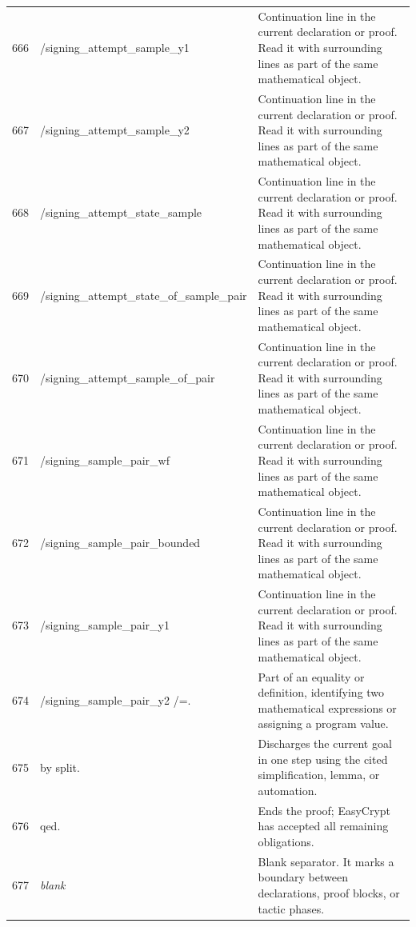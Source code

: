 \documentclass[10pt]{article}
\begin{document}
\begin{longtable}{r L{0.53\textwidth} L{0.37\textwidth}}
666 & {\ttfamily\scriptsize         /signing\_attempt\_sample\_y1} & Continuation line in the current declaration or proof.  Read it with surrounding lines as part of the same mathematical object. \\
667 & {\ttfamily\scriptsize         /signing\_attempt\_sample\_y2} & Continuation line in the current declaration or proof.  Read it with surrounding lines as part of the same mathematical object. \\
668 & {\ttfamily\scriptsize         /signing\_attempt\_state\_sample} & Continuation line in the current declaration or proof.  Read it with surrounding lines as part of the same mathematical object. \\
669 & {\ttfamily\scriptsize         /signing\_attempt\_state\_of\_sample\_pair} & Continuation line in the current declaration or proof.  Read it with surrounding lines as part of the same mathematical object. \\
670 & {\ttfamily\scriptsize         /signing\_attempt\_sample\_of\_pair} & Continuation line in the current declaration or proof.  Read it with surrounding lines as part of the same mathematical object. \\
671 & {\ttfamily\scriptsize         /signing\_sample\_pair\_wf} & Continuation line in the current declaration or proof.  Read it with surrounding lines as part of the same mathematical object. \\
672 & {\ttfamily\scriptsize         /signing\_sample\_pair\_bounded} & Continuation line in the current declaration or proof.  Read it with surrounding lines as part of the same mathematical object. \\
673 & {\ttfamily\scriptsize         /signing\_sample\_pair\_y1} & Continuation line in the current declaration or proof.  Read it with surrounding lines as part of the same mathematical object. \\
674 & {\ttfamily\scriptsize         /signing\_sample\_pair\_y2 /=.} & Part of an equality or definition, identifying two mathematical expressions or assigning a program value. \\
675 & {\ttfamily\scriptsize by split.} & Discharges the current goal in one step using the cited simplification, lemma, or automation. \\
676 & {\ttfamily\scriptsize qed.} & Ends the proof; EasyCrypt has accepted all remaining obligations. \\
677 & {\ttfamily\scriptsize \emph{blank}} & Blank separator.  It marks a boundary between declarations, proof blocks, or tactic phases. \\

\end{longtable}
\end{document}
